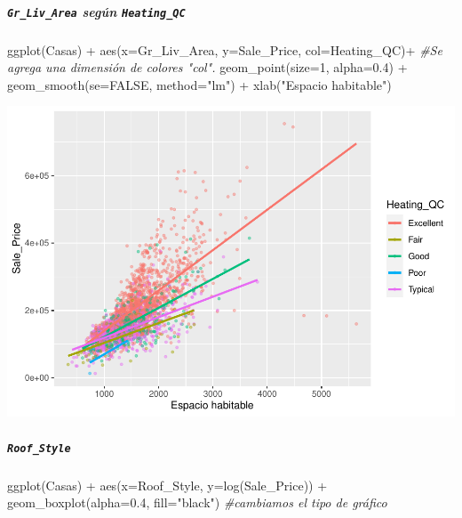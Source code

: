 \documentclass[
]{article}
\newenvironment{Shaded}{\begin{snugshade}}{\end{snugshade}}
\newcommand{\AttributeTok}[1]{\textcolor[rgb]{0.77,0.63,0.00}{#1}}
\newcommand{\CommentTok}[1]{\textcolor[rgb]{0.56,0.35,0.01}{\textit{#1}}}
\newcommand{\ConstantTok}[1]{\textcolor[rgb]{0.00,0.00,0.00}{#1}}
\newcommand{\DecValTok}[1]{\textcolor[rgb]{0.00,0.00,0.81}{#1}}
\newcommand{\FloatTok}[1]{\textcolor[rgb]{0.00,0.00,0.81}{#1}}
\newcommand{\FunctionTok}[1]{\textcolor[rgb]{0.00,0.00,0.00}{#1}}
\newcommand{\NormalTok}[1]{#1}
\newcommand{\SpecialCharTok}[1]{\textcolor[rgb]{0.00,0.00,0.00}{#1}}
\newcommand{\StringTok}[1]{\textcolor[rgb]{0.31,0.60,0.02}{#1}}
\begin{document}
\hypertarget{gr_liv_area-seguxfan-heating_qc}{%
\subparagraph{\texorpdfstring{\texttt{Gr\_Liv\_Area} según
\texttt{Heating\_QC}}{Gr\_Liv\_Area según Heating\_QC}}\label{gr_liv_area-seguxfan-heating_qc}}

\begin{Shaded}
\begin{Highlighting}[]
\FunctionTok{ggplot}\NormalTok{(Casas) }\SpecialCharTok{+}
  \FunctionTok{aes}\NormalTok{(}\AttributeTok{x=}\NormalTok{Gr\_Liv\_Area, }\AttributeTok{y=}\NormalTok{Sale\_Price, }\AttributeTok{col=}\NormalTok{Heating\_QC)}\SpecialCharTok{+} \CommentTok{\#Se agrega una dimensión de colores "col".}
  \FunctionTok{geom\_point}\NormalTok{(}\AttributeTok{size=}\DecValTok{1}\NormalTok{, }\AttributeTok{alpha=}\FloatTok{0.4}\NormalTok{) }\SpecialCharTok{+}
  \FunctionTok{geom\_smooth}\NormalTok{(}\AttributeTok{se=}\ConstantTok{FALSE}\NormalTok{, }\AttributeTok{method=}\StringTok{"lm"}\NormalTok{) }\SpecialCharTok{+}
  \FunctionTok{xlab}\NormalTok{(}\StringTok{"Espacio habitable"}\NormalTok{) }
\end{Highlighting}
\end{Shaded}

\includegraphics{LAB02_files/figure-latex/unnamed-chunk-1-1.pdf}

\hypertarget{roof_style}{%
\subparagraph{\texorpdfstring{\texttt{Roof\_Style}}{Roof\_Style}}\label{roof_style}}

\begin{Shaded}
\begin{Highlighting}[]
\FunctionTok{ggplot}\NormalTok{(Casas) }\SpecialCharTok{+}
  \FunctionTok{aes}\NormalTok{(}\AttributeTok{x=}\NormalTok{Roof\_Style, }\AttributeTok{y=}\FunctionTok{log}\NormalTok{(Sale\_Price)) }\SpecialCharTok{+}
  \FunctionTok{geom\_boxplot}\NormalTok{(}\AttributeTok{alpha=}\FloatTok{0.4}\NormalTok{, }\AttributeTok{fill=}\StringTok{"black"}\NormalTok{) }\CommentTok{\#cambiamos el tipo de gráfico}
\end{Highlighting}
\end{Shaded}
\end{document}
